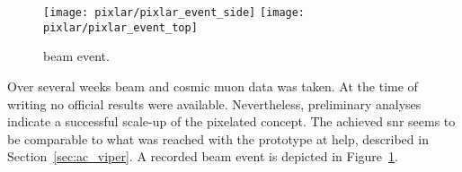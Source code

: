 \begin{figure}[tbp]
	\centering
	\texttt{[image: pixlar/pixlar\_event\_side]}
	\texttt{[image: pixlar/pixlar\_event\_top]}
	\caption[\pixlar{} beam event]{%
		\pixlar{} beam event.
	}
	\label{fig:pixlar_event}
\end{figure}

Over several weeks beam and cosmic muon data was taken.
At the time of writing no official results were available.
Nevertheless, preliminary analyses indicate a successful scale-up of the pixelated \lartpc{} concept.
The achieved \gls{snr} seems to be comparable to what was reached with the prototype at \gls{help}, described in Section~\ref{sec:ac_viper}.
A recorded beam event is depicted in Figure~\ref{fig:pixlar_event}.